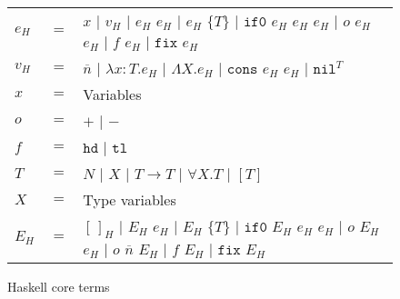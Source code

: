 \begin{figure}
\onehalfspacing
\begin{center}
\begin{tabular}{lcl}
$e_{H}$ & $=$ & $x$ $\vert$ $v_{H}$ $\vert$ $e_{H}$ $e_{H}$ $\vert$ $e_{H}$ $\lbrace T\rbrace$ $\vert$ $\mathtt{if0}$ $e_{H}$ $e_{H}$ $e_{H}$ $\vert$ $o$ $e_{H}$ $e_{H}$ $\vert$ $f$ $e_{H}$ $\vert$ $\mathtt{fix}$ $e_{H}$ \\
$v_{H}$ & $=$ & $\overline{n}$ $\vert$ $\lambda x:T.e_{H}$ $\vert$ $\Lambda X.e_{H}$ $\vert$ $\mathtt{cons}$ $e_{H}$ $e_{H}$ $\vert$ $\mathtt{nil}^{T}$ \\
$x$ & $=$ & Variables \\
$o$ & $=$ & $\mathtt{+}$ $\vert$ $\mathtt{-}$ \\
$f$ & $=$ & $\mathtt{hd}$ $\vert$ $\mathtt{tl}$ \\
$T$ & $=$ & $N$ $\vert$ $X$ $\vert$ $T\rightarrow T$ $\vert$ $\forall X.T$ $\vert$ $[T]$ \\
$X$ & $=$ & Type variables \\
$E_{H}$ & $=$ & $[\,]_{H}$ $\vert$ $E_{H}$ $e_{H}$ $\vert$ $E_{H}$ $\lbrace T\rbrace$ $\vert$ $\mathtt{if0}$ $E_{H}$ $e_{H}$ $e_{H}$ $\vert$ $o$ $E_{H}$ $e_{H}$ $\vert$ $o$ $\overline{n}$ $E_{H}$ $\vert$ $f$ $E_{H}$ $\vert$ $\mathtt{fix}$ $E_{H}$
\end{tabular}
\end{center}
\caption{Haskell core terms}
\label{fig:hct}
\end{figure}